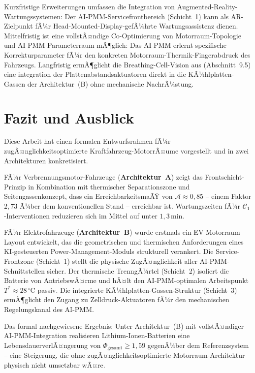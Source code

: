 ﻿\documentclass[12pt,a4paper]{article}
\begin{document}
Kurzfristige Erweiterungen umfassen die Integration von Augmented-Reality-Wartungs\-systemen:
Der AI-PMM-Servicefrontbereich (Schicht~1) kann als AR-Zielpunkt fÃ¼r
Head-Mounted-Display-gefÃ¼hrte Wartungsassistenz dienen. Mittelfristig ist
eine vollstÃ¤ndige Co-Optimierung von Motorraum-Topologie und AI-PMM-Parameterraum
mÃ¶glich: Das AI-PMM erlernt spezifische Korrekturparameter fÃ¼r den
konkreten Motorraum-Thermik-Fingerabdruck des Fahrzeugs. Langfristig
ermÃ¶glicht die Breathing-Cell-Vision aus \cite{Epp2026liion} (Abschnitt~9.5)
eine integration der Plattenabstandsaktuatoren direkt in die KÃ¼hlplatten-Gassen
der Architektur~(B) ohne mechanische NachrÃ¼stung.

\section{Fazit und Ausblick}
\label{sec:fazit}

Diese Arbeit hat einen formalen Entwurfsrahmen fÃ¼r zugÃ¤nglichkeitsoptimierte
Kraftfahr\-zeug-MotorrÃ¤ume vorgestellt und in zwei Architekturen konkretisiert.

FÃ¼r Verbrennungsmotor-Fahrzeuge (\textbf{Architektur~A}) zeigt das
Frontschicht-Prinzip in Kombination mit thermischer Separationszone und
Seitengassenkonzept, dass ein ErreichbarkeitsmaÃŸ von $\mathcal{A} \approx 0{,}85$
-- einem Faktor $2{,}73$ Ã¼ber dem konventionellen Stand -- erreichbar ist.
Wartungszeiten fÃ¼r $\mathcal{C}_1$-Interventionen reduzieren sich im Mittel
auf unter $1{,}3\,\mathrm{min}$.

FÃ¼r Elektrofahrzeuge (\textbf{Architektur~B}) wurde erstmals ein EV-Motorraum-Layout
entwickelt, das die geometrischen und thermischen Anforderungen eines KI-gesteuerten
Power-Management-Moduls \cite{Epp2026liion} strukturell verankert. Die Service-Frontzone
(Schicht~1) stellt die physische ZugÃ¤nglichkeit aller AI-PMM-Schnittstellen sicher.
Der thermische TrenngÃ¼rtel (Schicht~2) isoliert die Batterie von AntriebswÃ¤rme und
hÃ¤lt den AI-PMM-optimalen Arbeitspunkt $T^* \approx 28\,^\circ\mathrm{C}$ passiv.
Die integrierte KÃ¼hlplatten-Gassen-Struktur (Schicht~3) ermÃ¶glicht den Zugang zu
Zelldruck-Aktuatoren fÃ¼r den mechanischen Regelungskanal des AI-PMM.

Das formal nachgewiesene Ergebnis: Unter Architektur~(B) mit vollstÃ¤ndiger
AI-PMM-Integration realisieren Lithium-Ionen-Batterien eine LebensdauerverlÃ¤ngerung
von $\Phi_\mathrm{gesamt} \geq 1{,}59$ gegenÃ¼ber dem Referenzsystem -- eine
Steigerung, die ohne zugÃ¤nglichkeitsoptimierte Motorraum-Architektur physisch
nicht umsetzbar wÃ¤re.
\end{document}
